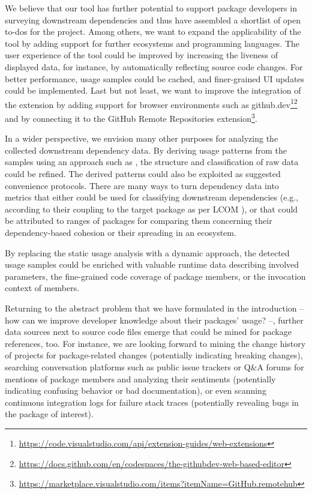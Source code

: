 We believe that our tool has further potential to support package developers in surveying downstream dependencies and thus have assembled a shortlist of open to-dos for the project.
Among others, we want to expand the applicability of the tool by adding support for further ecosystems and programming languages.
The user experience of the tool could be improved by increasing the liveness of displayed data, for instance, by automatically reflecting source code changes.
For better performance, usage samples could be cached, and finer-grained UI updates could be implemented.
Last but not least, we want to improve the integration of the extension by adding support for browser environments such as github.dev\footnote{\url{https://code.visualstudio.com/api/extension-guides/web-extensions}}\footnoteseparator\footnote{\url{https://docs.github.com/en/codespaces/the-githubdev-web-based-editor}} and by connecting it to the GitHub Remote Repositories extension\footnote{\url{https://marketplace.visualstudio.com/items?itemName=GitHub.remotehub}}.

In a wider perspective, we envision many other purposes for analyzing the collected downstream dependency data.
By deriving usage patterns from the samples using an approach such as \cite{zhong2009mapo}, the structure and classification of raw data could be refined.
The derived patterns could also be exploited as suggested convenience protocols.
There are many ways to turn dependency data into metrics that either could be used for classifying downstream dependencies (e.g., according to their coupling to the target package as per LCOM \citep{chidamber1994metrics}), or that could be attributed to ranges of packages for comparing them concerning their dependency-based cohesion or their spreading in an ecosystem.

By replacing the static usage analysis with a dynamic approach, the detected usage samples could be enriched with valuable runtime data describing involved parameters, the fine-grained code coverage of package members, or the invocation context of members.

Returning to the abstract problem that we have formulated in the introduction -- how can we improve developer knowledge about their packages' usage? --, further data sources next to source code files emerge that could be mined for package references, too.
For instance, we are looking forward to mining the change history of projects for package-related changes (potentially indicating breaking changes), searching conversation platforms such as public issue trackers or Q\&A forums for mentions of package members and analyzing their sentiments (potentially indicating confusing behavior or bad documentation), or even scanning continuous integration logs for failure stack traces (potentially revealing bugs in the package of interest).
